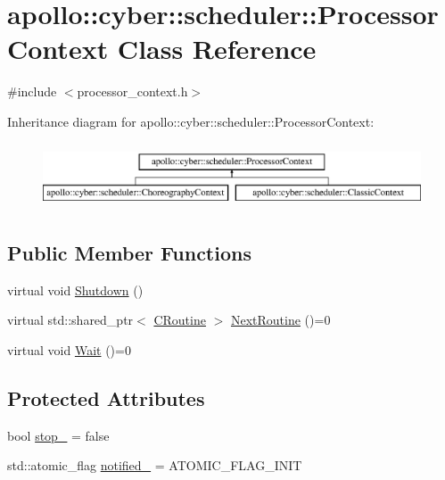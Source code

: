 \hypertarget{classapollo_1_1cyber_1_1scheduler_1_1ProcessorContext}{\section{apollo\-:\-:cyber\-:\-:scheduler\-:\-:Processor\-Context Class Reference}
\label{classapollo_1_1cyber_1_1scheduler_1_1ProcessorContext}
}


{\ttfamily \#include $<$processor\-\_\-context.\-h$>$}

Inheritance diagram for apollo\-:\-:cyber\-:\-:scheduler\-:\-:Processor\-Context\-:\begin{figure}[H]
\begin{center}
\leavevmode
\includegraphics[height=1.964912cm]{classapollo_1_1cyber_1_1scheduler_1_1ProcessorContext}
\end{center}
\end{figure}
\subsection*{Public Member Functions}
\begin{DoxyCompactItemize}
\item 
virtual void \hyperlink{classapollo_1_1cyber_1_1scheduler_1_1ProcessorContext_ab36b8e9524ea0e02cba88b7d4e0e3079}{Shutdown} ()
\item 
virtual std\-::shared\-\_\-ptr$<$ \hyperlink{classapollo_1_1cyber_1_1croutine_1_1CRoutine}{C\-Routine} $>$ \hyperlink{classapollo_1_1cyber_1_1scheduler_1_1ProcessorContext_a0923b50903b11612234355566ab573e0}{Next\-Routine} ()=0
\item 
virtual void \hyperlink{classapollo_1_1cyber_1_1scheduler_1_1ProcessorContext_a0a2e1914277be7a5fe81f459c83b6644}{Wait} ()=0
\end{DoxyCompactItemize}
\subsection*{Protected Attributes}
\begin{DoxyCompactItemize}
\item 
bool \hyperlink{classapollo_1_1cyber_1_1scheduler_1_1ProcessorContext_a19eebaac060d52fb252077f59762a97e}{stop\-\_\-} = false
\item 
std\-::atomic\-\_\-flag \hyperlink{classapollo_1_1cyber_1_1scheduler_1_1ProcessorContext_ad4e0ac53246d1d65b4d14a1f438715e3}{notified\-\_\-} = A\-T\-O\-M\-I\-C\-\_\-\-F\-L\-A\-G\-\_\-\-I\-N\-I\-T
\end{DoxyCompactItemize}


